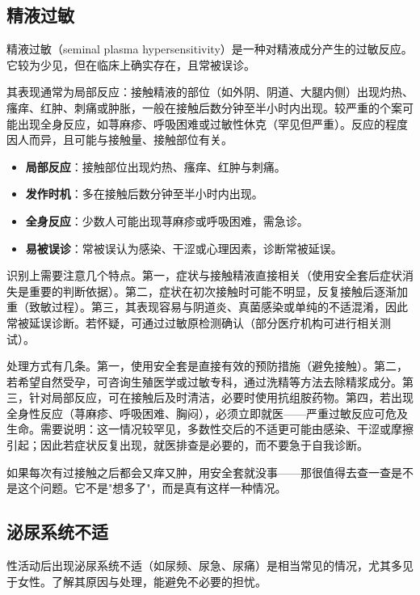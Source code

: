 \documentclass[12pt,UTF8]{ctexbook}
\newcommand{\keyword}[1]{\textbf{#1}}
\begin{document}
\subsection{精液过敏}

精液过敏（seminal plasma hypersensitivity）是一种对精液成分产生的过敏反应。它较为少见，但在临床上确实存在，且常被误诊。

其表现通常为局部反应：接触精液的部位（如外阴、阴道、大腿内侧）出现灼热、瘙痒、红肿、刺痛或肿胀，一般在接触后数分钟至半小时内出现。较严重的个案可能出现全身反应，如荨麻疹、呼吸困难或过敏性休克（罕见但严重）。反应的程度因人而异，且可能与接触量、接触部位有关。

\begin{itemize}
  \item \keyword{局部反应}：接触部位出现灼热、瘙痒、红肿与刺痛。
  \item \keyword{发作时机}：多在接触后数分钟至半小时内出现。
  \item \keyword{全身反应}：少数人可能出现荨麻疹或呼吸困难，需急诊。
  \item \keyword{易被误诊}：常被误认为感染、干涩或心理因素，诊断常被延误。
\end{itemize}

识别上需要注意几个特点。第一，症状与接触精液直接相关（使用安全套后症状消失是重要的判断依据）。第二，症状在初次接触时可能不明显，反复接触后逐渐加重（致敏过程）。第三，其表现容易与阴道炎、真菌感染或单纯的不适混淆，因此常被延误诊断。若怀疑，可通过过敏原检测确认（部分医疗机构可进行相关测试）。

处理方式有几条。第一，使用安全套是直接有效的预防措施（避免接触）。第二，若希望自然受孕，可咨询生殖医学或过敏专科，通过洗精等方法去除精浆成分。第三，针对局部反应，可在接触后及时清洁，必要时使用抗组胺药物。第四，若出现全身性反应（荨麻疹、呼吸困难、胸闷），必须立即就医——严重过敏反应可危及生命。需要说明：这一情况较罕见，多数性交后的不适更可能由感染、干涩或摩擦引起；因此若症状反复出现，就医排查是必要的，而不要急于自我诊断。

\begin{tcolorbox}[colback=pink!5!white,colframe=red!50!black,title=贴心小叮咛]
如果每次有过接触之后都会又痒又肿，用安全套就没事——那很值得去查一查是不是这个问题。它不是"想多了"，而是真有这样一种情况。
\end{tcolorbox}
\subsection{泌尿系统不适}

性活动后出现泌尿系统不适（如尿频、尿急、尿痛）是相当常见的情况，尤其多见于女性。了解其原因与处理，能避免不必要的担忧。
\end{document}
